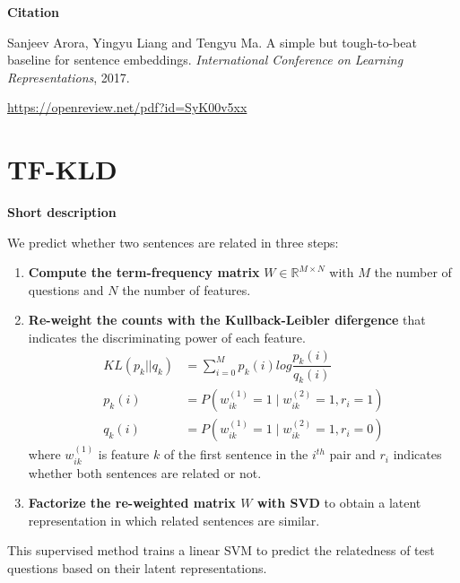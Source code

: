 \textbf{Citation}

    Sanjeev Arora, Yingyu Liang and Tengyu Ma.
    A simple but tough-to-beat baseline for sentence embeddings.
    \textit{International Conference on Learning Representations}, 2017.

\url{https://openreview.net/pdf?id=SyK00v5xx}




\newpage
\section{TF-KLD}


\textbf{Short description}

We predict whether two sentences are related in three steps:
\begin{enumerate}[topsep=0pt, itemsep=0pt]
    \item \textbf{Compute the term-frequency matrix} $W \in \mathbb{R}^{M \times N}$ with $M$ the number of questions and $N$ the number of features.
    
    \item \textbf{Re-weight the counts with the Kullback-Leibler difergence} that indicates the discriminating power of each feature.
    \begin{equation*}
        \begin{aligned}
        KL(p_k || q_k) &= \sum_{i=0}^M p_k(i) log\dfrac{p_k(i)}{q_k(i)}\\
        p_k(i) &= P(w_{ik}^{(1)}=1 \; | \; w_{ik}^{(2)} = 1, r_i=1)\\
        q_k(i) &= P(w_{ik}^{(1)}=1 \; | \; w_{ik}^{(2)} = 1, r_i=0)
        \end{aligned}
    \end{equation*}
    where $w_{ik}^{(1)}$ is feature $k$ of the first sentence in the $i^{th}$ pair and $r_i$ indicates whether both sentences are related or not.
    
    \item \textbf{Factorize the re-weighted matrix $W$ with SVD} to obtain a latent representation in which related sentences are similar.
    
\end{enumerate}
This supervised method trains a linear SVM to predict the relatedness of test questions based on their latent representations.

